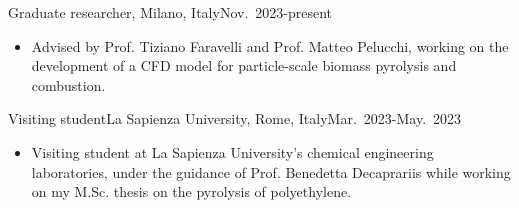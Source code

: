 \begin{position}{Graduate researcher}{\polimi, Milano, Italy}{Nov.~2023-present}
   \begin{itemize}
      \item[ ] Advised by Prof. Tiziano Faravelli and Prof. Matteo Pelucchi, working on the development of
         a CFD model for particle-scale biomass pyrolysis and combustion.
   \end{itemize}
\end{position}

\begin{position}{Visiting student}{La Sapienza University, Rome, Italy}{Mar.~2023-May.~2023}
   \begin{itemize}
      \item[ ] Visiting student at La Sapienza University's chemical engineering laboratories, under the guidance of Prof. Benedetta Decaprariis while working on my M.Sc. thesis on the pyrolysis of polyethylene.
   \end{itemize}
\end{position}
